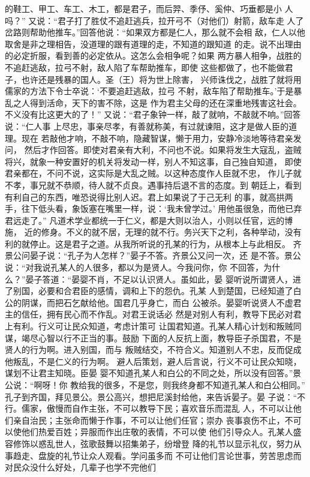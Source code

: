 \documentclass[12pt,UTF8]{ctexbook}
\begin{document}
的鞋工、甲工、车工、木工，都是君子，而后羿、季伃、奚仲、巧垂都是小 
人吗？” 
又说：“君子打了胜仗不追赶逃兵，拉开弓不（对他们）射箭，敌车走 
人了岔路则帮助他推车。”回答他说：“如果双方都是仁人，那么就不会相 
敌，仁人以他取舍是非之理相告，没道理的跟有道理的走，不知道的跟知道 
的走。说不出理由的必定折服，看到善的必定依从。这怎么会相争呢？如果 
两方暴人相争，战胜的不追赶逃敌，拉弓不射，敌人陷了车帮助推车，即使 
这些都做了，也不能做君子，也许还是残暴的国人。圣（王）将为世上除害， 
兴师诛伐之，战胜了就将用儒家的方法下令士卒说：‘不要追赶逃敌，拉弓 
不射，敌车陷了帮助推车。’于是暴乱之人得到活命，天下的害不除，这是 
作为君主父母的还在深重地残害这社会。不义没有比这更大的了！” 
又说：“君子象钟一样，敲了就响，不敲就不响。”回答说：“仁人事 
上尽忠，事亲尽孝，有善就称美，有过就谏阻，这才是做人臣的道理。现在 
若敲他才响，不敲不响，隐藏智谋，懒于用力，安静冷淡地等待君亲发问， 
然后才作回答。即使对君亲有大利，不问也不说。如果将发生大寇乱，盗贼 
将兴，就象一种安置好的机关将发动一样，别人不知这事，自己独自知道， 
即使君亲都在，不问不说，这实际是大乱之贼。以这种态度作人臣就不忠， 
作儿子就不孝，事兄就不恭顺，待人就不贞良。遇事持后退不言的态度。到 
朝廷上，看到有利自己的东西，唯恐说得比别人迟。君上如果说了于己无利 
的事，就高拱两手，往下低头看，象饭塞在嘴里一样，说：‘我未曾学过。’ 
用他虽很急，而他已弃君远走了。” 
凡道术学业都统一于仁义，都是大则以治人，小则以任官，远的博施， 
近的修身。不义的就不居，无理的就不行。务兴天下之利，各种举动，没有 
利的就停止。这是君子之道。从我所听说的孔某的行为，从根本上与此相反。 
齐景公问晏子说：“孔子为人怎样？”晏子不答。齐景公又问一次，还 
是不答。景公说：“对我说孔某人的人很多，都以为是贤人。今我问你，你 
不回答，为什么？”晏子答道：“晏婴不肖，不足以认识贤人。虽如此，晏 
婴听说所谓贤人，进了别国，必要和合君臣的感情，调和上下的怨仇。孔某 
人到楚国，已经知道了白公的阴谋，而把石乞献给他。国君几乎身亡，而白 
公被杀。晏婴听说贤人不虚君主的信任，拥有民心而不作乱。对君王说话必 
然是对别人有利，教导下民必对君上有利。行义可让民众知道，考虑计策可 
让国君知道。孔某人精心计划和叛贼同谋，竭尽心智以行不正当的事。鼓励 
下面的人反抗上面，教导臣子杀国君，不是贤人的行为啊。进入别国，而与 
叛贼结交，不符合义。知道别人不忠，反而促成他叛乱，不是仁义的行为啊。 
避人后策划，避人后言说，行义不可让民众知晓，谋划不让君主知晓。臣晏 
婴不知道孔某人和白公的不同之处，所以没有回答。”景公说：“啊呀！你 
教给我的很多，不是您，则我终身都不知道孔某人和白公相同。” 
孔子到齐国，拜见景公。景公高兴，想把尼溪封给他，来告诉晏子。晏 
子说：“不行。儒家，傲慢而自作主张，不可以教导下民；喜欢音乐而混乱 
人，不可以让他们亲自治民；主张命而懒于作事，不可以让他们任官；崇办 
丧事哀伤不止，不可以使他们热爱百姓；异服而作出庄敬的表情，不可以使 
他们引导众人。孔某人盛容修饰以惑乱世人，弦歌鼓舞以招集弟子，纷增登 
降的礼节以显示礼仪，努力从事趋走、盘旋的礼节让众人观看。学问虽多而 
不可让他们言论世事，劳苦思虑而对民众没什么好处，几辈子也学不完他们 
\end{document}
